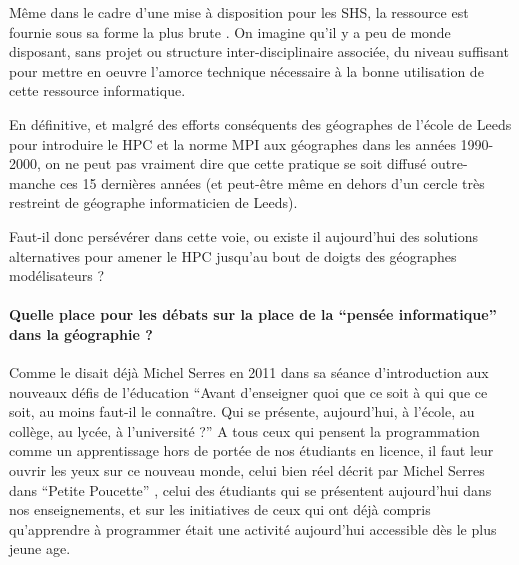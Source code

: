 Même dans le cadre d'une mise à disposition pour les SHS, la ressource est fournie sous sa forme la plus brute . On imagine qu'il y a peu de monde disposant, sans projet ou structure inter-disciplinaire associée, du niveau suffisant pour mettre en oeuvre l'amorce technique nécessaire à la bonne utilisation de cette ressource informatique.

En définitive, et malgré des efforts conséquents des géographes de l'école de Leeds \autocite{Openshaw2000} pour introduire le HPC et la norme MPI aux géographes dans les années 1990-2000, on ne peut pas vraiment dire que cette pratique se soit diffusé outre-manche ces 15 dernières années (et peut-être même en dehors d'un cercle très restreint de géographe informaticien de Leeds).

Faut-il donc persévérer dans cette voie, ou existe il aujourd'hui des solutions alternatives pour amener le HPC jusqu'au bout de doigts des géographes modélisateurs ?







\paragraph{Quelle place pour les débats sur la place de la \enquote{pensée informatique} dans la géographie ?}
\label{p:Tournantenseignements}

Comme le disait déjà Michel Serres en 2011 dans sa séance d'introduction aux nouveaux défis de l'éducation \enquote{Avant d’enseigner quoi que ce soit à qui que ce soit, au moins faut-il le connaître. Qui se présente, aujourd’hui, à l’école, au collège, au lycée, à l’université ?} \autocite{Serres2011} A tous ceux qui pensent la programmation comme un apprentissage hors de portée de nos étudiants en licence, il faut leur ouvrir les yeux sur ce nouveau monde, celui bien réel décrit par Michel Serres dans \enquote{Petite Poucette} \autocite{Serres2012}, celui des étudiants qui se présentent aujourd'hui dans nos enseignements, et sur les initiatives de ceux qui ont déjà compris qu'apprendre à programmer était une activité aujourd'hui accessible dès le plus jeune age.

